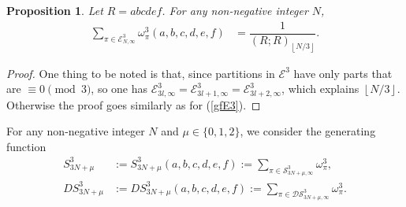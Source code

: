 \documentclass[12pt]{amsart}
\numberwithin{equation}{section}
\theoremstyle{plain}
\newtheorem{proposition}[theorem]{Proposition}
\theoremstyle{definition}
\begin{document}
\begin{proposition} Let $R=abcdef$.
For any non-negative integer $N$,
\begin{align}
\label{gfE3b}\sum\limits_{\pi\in \mathcal{E}^3_{N,\infty}}\omega^3_{\pi}(a,b,c,d,e,f) &=\dfrac{1}{(R;R)_{\left\lfloor{N}/{3}\right\rfloor}}.
\end{align}
\end{proposition}
\begin{proof}
One thing to be noted is that, since partitions in $\mathcal{E}^3$ have only parts that are $\equiv 0 \pmod 3$, so one has $\mathcal{E}^3_{3l,\infty}=\mathcal{E}^3_{3l+1,\infty}=\mathcal{E}^3_{3l+2,\infty}$, which explains $\left\lfloor{N}/{3}\right\rfloor$. Otherwise the proof goes similarly as for (\ref{gfE3}).
\end{proof}

For any non-negative integer $N$ and $\mu\in \{0, 1,2\}$, we consider the generating function
\begin{align*}
S_{3N+\mu}^3 &:=S_{3N+\mu}^3(a,b,c,d,e,f):=\sum\limits_{\pi\in\mathcal{S}_{3N+\mu,\infty}^3}
\omega^3_{\pi},\\
DS_{3N+\mu}^3 &:=DS_{3N+\mu}^3(a,b,c,d,e,f):=\sum\limits_{\pi\in\mathcal{DS}_{3N+\mu,\infty}^3}
\omega^3_{\pi}.
\end{align*}
\end{document}
